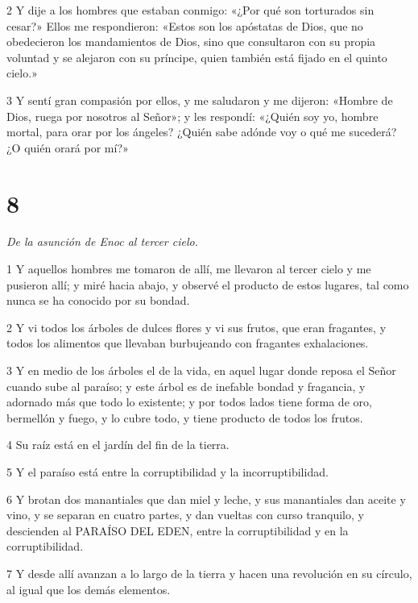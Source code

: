 \par 2 Y dije a los hombres que estaban conmigo: «¿Por qué son torturados sin cesar?» Ellos me respondieron: «Estos son los apóstatas de Dios, que no obedecieron los mandamientos de Dios, sino que consultaron con su propia voluntad y se alejaron con su príncipe, quien también está fijado en el quinto cielo.»

\par 3 Y sentí gran compasión por ellos, y me saludaron y me dijeron: «Hombre de Dios, ruega por nosotros al Señor»; y les respondí: «¿Quién soy yo, hombre mortal, para orar por los ángeles? ¿Quién sabe adónde voy o qué me sucederá? ¿O quién orará por mí?»

\chapter{8}

\par \textit{De la asunción de Enoc al tercer cielo.}

\par 1 Y aquellos hombres me tomaron de allí, me llevaron al tercer cielo y me pusieron allí; y miré hacia abajo, y observé el producto de estos lugares, tal como nunca se ha conocido por su bondad.

\par 2 Y vi todos los árboles de dulces flores y vi sus frutos, que eran fragantes, y todos los alimentos que llevaban burbujeando con fragantes exhalaciones.

\par 3 Y en medio de los árboles el de la vida, en aquel lugar donde reposa el Señor cuando sube al paraíso; y este árbol es de inefable bondad y fragancia, y adornado más que todo lo existente; y por todos lados tiene forma de oro, bermellón y fuego, y lo cubre todo, y tiene producto de todos los frutos.

\par 4 Su raíz está en el jardín del fin de la tierra.

\par 5 Y el paraíso está entre la corruptibilidad y la incorruptibilidad.

\par 6 Y brotan dos manantiales que dan miel y leche, y sus manantiales dan aceite y vino, y se separan en cuatro partes, y dan vueltas con curso tranquilo, y descienden al PARAÍSO DEL EDEN, entre la corruptibilidad y en la corruptibilidad.

\par 7 Y desde allí avanzan a lo largo de la tierra y hacen una revolución en su círculo, al igual que los demás elementos.


